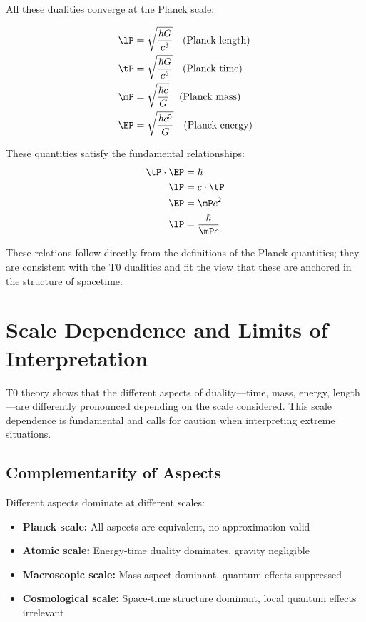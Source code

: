 	All these dualities converge at the Planck scale:
	
	\begin{align}
		\lP &= \sqrt{\frac{\hbar G}{c^3}} \quad \text{(Planck length)} \\
		\tP &= \sqrt{\frac{\hbar G}{c^5}} \quad \text{(Planck time)} \\
		\mP &= \sqrt{\frac{\hbar c}{G}} \quad \text{(Planck mass)} \\
		\EP &= \sqrt{\frac{\hbar c^5}{G}} \quad \text{(Planck energy)}
	\end{align}
	
	These quantities satisfy the fundamental relationships:
	\begin{align}
		\tP \cdot \EP &= \hbar \\
		\lP &= c \cdot \tP \\
		\EP &= \mP c^2 \\
		\lP &= \frac{\hbar}{\mP c}
	\end{align}
	
	These relations follow directly from the definitions of the Planck quantities; they are consistent with the T0 dualities and fit the view that these are anchored in the structure of spacetime.
	
	\section{Scale Dependence and Limits of Interpretation}
	
	T0 theory shows that the different aspects of duality—time, mass, energy, length—are differently pronounced depending on the scale considered. This scale dependence is fundamental and calls for caution when interpreting extreme situations.
	
	\subsection{Complementarity of Aspects}
	
	Different aspects dominate at different scales:
	\begin{itemize}
		\item \textbf{Planck scale:} All aspects are equivalent, no approximation valid
		\item \textbf{Atomic scale:} Energy-time duality dominates, gravity negligible
		\item \textbf{Macroscopic scale:} Mass aspect dominant, quantum effects suppressed
		\item \textbf{Cosmological scale:} Space-time structure dominant, local quantum effects irrelevant
	\end{itemize}
	
